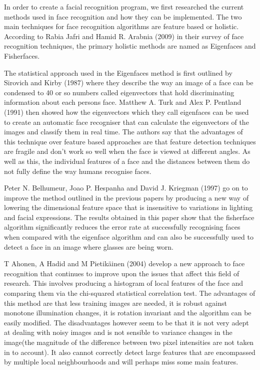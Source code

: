 In order to create a facial recognition program, we first researched the current methods used in face recognition and how they can be implemented. The two main techniques for face recognition algorithms are feature based or holistic. According to Rabia Jafri and Hamid R. Arabnia (2009)\cite{FR_survey} in their survey of face recognition techniques, the primary holistic methods are named as Eigenfaces and Fisherfaces.

The statistical approach used in the Eigenfaces method is first outlined by Sirovich and Kirby (1987)\cite{sirovich1987low} where they describe the way an image of a face can be condensed to 40 or so numbers called eigenvectors that hold discriminating information about each persons face.
Matthew A. Turk and Alex P. Pentland (1991)\cite{turk1991face} then showed how the eigenvectors which they call eigenfaces can be used to create an automatic face recogniser that can calculate the eigenvectors of the images and classify them in real time. The authors say that the advantages of this technique over feature based approaches are that feature detection techniques are fragile and don't work so well when the face is viewed at different angles. As well as this, the individual features of a face and the distances between them do not fully define the way humans recognise faces.

Peter N. Belhumeur, Joao P. Hespanha and David J. Kriegman (1997)\cite{Eigenfaces_vs_Fisherfaces} go on to improve the method outlined in the previous papers by producing a new way of lowering the dimensional feature space that is insensitive to variations in lighting and facial expressions. The results obtained in this paper show that the fisherface algorithm significantly reduces the error rate at successfully recognising faces when compared with the eigenface algorithm and can also be successfully used to detect a face in an image where glasses are being worn.


T Ahonen, A Hadid and M Pietik\"{a}inen (2004)\cite{ahonen2004face} develop a new approach to face recognition that continues to improve upon the issues that affect this field of research. This involves producing a histogram of local features of the face and comparing them via the chi-squared statistical correlation test. The advantages of this method are that less training images are needed, it is robust against monotone illumination changes, it is rotation invariant and the algorithm can be easily modified. The disadvantages however seem to be that it is not very adept at dealing with noisy images and is not sensible to variance changes in the image(the magnitude of the difference between two pixel intensities are not taken in to account). It also cannot correctly detect large features that are encompassed by multiple local neighbourhoods and will perhaps miss some main features.

